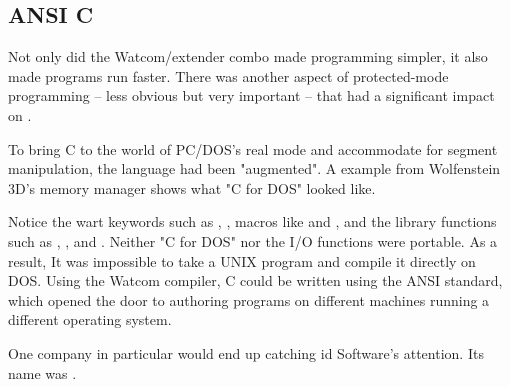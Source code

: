 \subsection{ANSI C}
Not only did the Watcom/extender combo made programming simpler, it also made programs run faster. There was another aspect of protected-mode programming -- less obvious but very important -- that had a significant impact on \doom.\\
\par
To bring C to the world of PC/DOS's real mode and accommodate for segment manipulation, the language had been "augmented". A example from Wolfenstein 3D's memory manager shows what "C for DOS" looked like.\\
\par
{}
\par
Notice the wart keywords such as , , macros like  and , and the  library functions such as , , and . Neither "C for DOS" nor the I/O functions were portable. As a result, It was impossible to take a UNIX program and compile it directly on DOS. Using the Watcom compiler, C could be written using the ANSI standard, which opened the door to authoring programs on different machines running a different operating system.\\
\par
 One company in particular would end up catching id Software's attention. Its name was \NeXTns.

